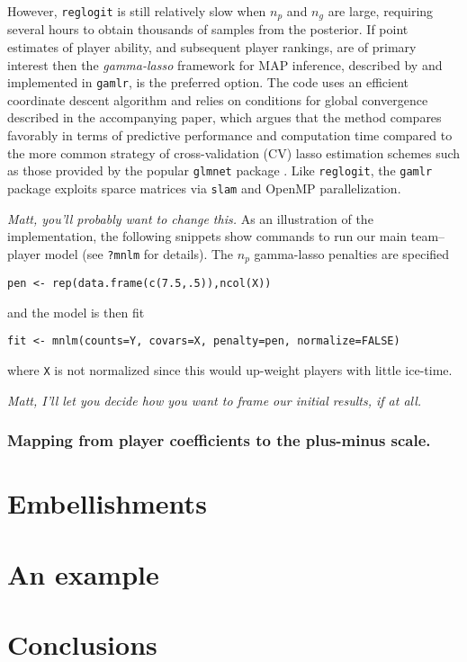 However, {\tt reglogit} is still relatively slow when $n_p$ and $n_g$ are
large, requiring several hours to obtain thousands of samples from the
posterior.  If point estimates of player ability, and subsequent player
rankings, are of primary interest then the {\em gamma-lasso} framework for MAP
inference, described by \cite{taddy:2012} and implemented in {\tt gamlr}, is
the preferred option. The code uses an efficient coordinate descent algorithm
and relies on conditions for global convergence described in the accompanying
paper, which argues that the method compares favorably in terms of predictive
performance and computation time compared to the more common strategy of
cross-validation (CV) lasso estimation schemes such as those provided by the
popular {\tt glmnet} package
\cite{glmnet}.  Like {\tt reglogit}, the {\tt gamlr} package exploits sparce
matrices via {\tt slam} and OpenMP parallelization.

{\em Matt, you'll probably want to change this.}  As an illustration of the
implementation, the following snippets show commands to run our main
team--player model (see \verb!?mnlm! for details).  
The $n_p$ gamma-lasso penalties are specified 
\begin{verbatim}
pen <- rep(data.frame(c(7.5,.5)),ncol(X))
\end{verbatim}
and the model is then fit
\begin{verbatim}
fit <- mnlm(counts=Y, covars=X, penalty=pen, normalize=FALSE)
\end{verbatim}
where \verb!X! is not normalized since this would up-weight players with little ice-time.

{\em Matt, I'll let you decide how you want to frame our initial results, if at all.}

\subsubsection{Mapping from player coefficients to the plus-minus scale.}



\section{Embellishments}
\label{sec:embell}

\section{An example}
\label{sec:example}

\section{Conclusions}
\label{sec:conclude}


